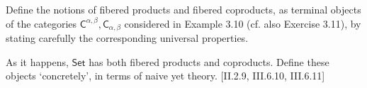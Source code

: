 \begin{problem}
  \def \C {\mathsf{C}}
  \def \Set {\mathsf{Set}}
  Define the notions of fibered products and fibered coproducts, as terminal
  objects of the categories $\C^{\alpha,\beta}, \C_{\alpha,\beta}$ considered in
  Example 3.10 (cf. also Exercise 3.11), by stating carefully the corresponding
  universal properties.

  As it happens, $\Set$ has both fibered products and coproducts. Define these
  objects `concretely', in terms of naive yet theory. [II.2.9, III.6.10, III.6.11]
\end{problem}
